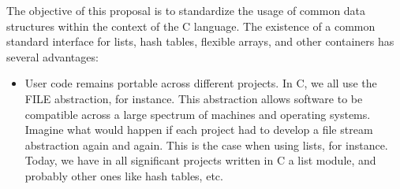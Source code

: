 The objective of this proposal is to standardize the usage of common data structures within the context of the C language. The existence of a common standard interface for lists, hash tables, flexible arrays, and other containers has several advantages:
\begin{itemize}
\item
User code remains portable across different projects. In C, we all use the FILE abstraction, for instance. This abstraction allows software to be 
compatible across a large spectrum of machines and operating systems. Imagine what would happen if each project had to develop a file stream
abstraction again and again. This is the case when using lists, for instance. Today, we have in all significant projects written in C a list
module, and probably other ones like hash tables, etc. 


\end{itemize}
